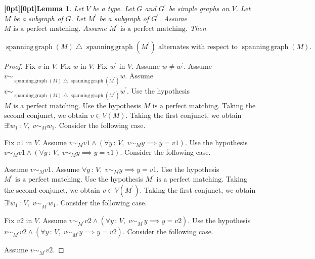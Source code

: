 \documentclass{article}
\makeatletter
\newcommand{\paperanchor}[1]{\hypertarget{#1}{}}%
\def\paperdest{\pdfextension dest}\def\paperstart{\pdfextension startlink}%
\def\paperend{\pdfextension endlink}\def\papercolor{\pdfextension colorstack}%
\let\paperdest\pdfdest\let\paperstart\pdfstartlink\let\paperend\pdfendlink\let\papercolor\pdfcolorstack
\newcommand{\paperanchor}[1]{\paperdest name{#1} xyz}%
\newcommand{\paperanchor}[1]{\special{pdf:dest (#1) [@thispage /XYZ null @ypos null]}}%
\newcommand{\paperlineanchor}[1]{\raisebox{10pt}[0pt][0pt]{\paperanchor{#1}}}
\DeclareRobustCommand{\paperresultname}[1]{\paperlineanchor{theorem:\arabic{theorem}}#1}
\theoremstyle{paperresult}
\newtheorem{lemma}[theorem]{\paperresultname{Lemma}}
\newenvironment{proofstep}{\par\smallskip\ifdim\leftskip<3em\relax\advance\leftskip by 1em\relax\fi\noindent\ignorespaces}{\par\smallskip}
\makeatother
\begin{document}
\begin{lemma}\label{theorem:45}
Let \(V\) be a type. Let \(G\) and \(G^{'}\) be simple graphs on \(V\). Let \(M\) be a subgraph of \(G\). Let \(M^{'}\) be a subgraph of \(G^{'}\). Assume \(M\text{ is a perfect matching}\). Assume \(M^{'}\text{ is a perfect matching}\). Then
\begin{center}
\(\displaystyle \operatorname{spanning\,graph}(M) \mathbin{\triangle} \operatorname{spanning\,graph}(M^{'})\text{ alternates with respect to }\operatorname{spanning\,graph}(M).\)
\end{center}
\end{lemma}

\begin{proof}
Fix \(v\) in \(V\).
Fix \(w\) in \(V\).
Fix \(w^{'}\) in \(V\).
Assume \(w \ne w^{'}\).
Assume \(v \sim_{\operatorname{spanning\,graph}(M) \mathbin{\triangle} \operatorname{spanning\,graph}(M^{'})} w\).
Assume \(v \sim_{\operatorname{spanning\,graph}(M) \mathbin{\triangle} \operatorname{spanning\,graph}(M^{'})} w^{'}\).
Use the hypothesis \(M\text{ is a perfect matching}\).
Use the hypothesis \(M\text{ is a perfect matching}\).
Taking the second conjunct, we obtain \(v \in V(M)\).
Taking the first conjunct, we obtain \(\exists! w_{1}\, :\, V,\; v \sim_{M} w_{1}\).
Consider the following case.
\begin{proofstep}
Fix \(\mathit{v1}\) in \(V\).
Assume \(v \sim_{M} \mathit{v1} \land \left(\forall y\, :\, V,\; v \sim_{M} y \implies y = \mathit{v1}\right)\).
Use the hypothesis \(v \sim_{M} \mathit{v1} \land \left(\forall y\, :\, V,\; v \sim_{M} y \implies y = \mathit{v1}\right)\).
Consider the following case.
\begin{proofstep}
Assume \(v \sim_{M} \mathit{v1}\).
Assume \(\forall y\, :\, V,\; v \sim_{M} y \implies y = \mathit{v1}\).
Use the hypothesis \(M^{'}\text{ is a perfect matching}\).
Use the hypothesis \(M^{'}\text{ is a perfect matching}\).
Taking the second conjunct, we obtain \(v \in V(M^{'})\).
Taking the first conjunct, we obtain \(\exists! w_{1}\, :\, V,\; v \sim_{M^{'}} w_{1}\).
Consider the following case.
\begin{proofstep}
Fix \(\mathit{v2}\) in \(V\).
Assume \(v \sim_{M^{'}} \mathit{v2} \land \left(\forall y\, :\, V,\; v \sim_{M^{'}} y \implies y = \mathit{v2}\right)\).
Use the hypothesis \(v \sim_{M^{'}} \mathit{v2} \land \left(\forall y\, :\, V,\; v \sim_{M^{'}} y \implies y = \mathit{v2}\right)\).
Consider the following case.
\begin{proofstep}
Assume \(v \sim_{M^{'}} \mathit{v2}\).

\end{proofstep}
\end{proofstep}
\end{proofstep}
\end{proofstep}
\end{proof}
\end{document}
